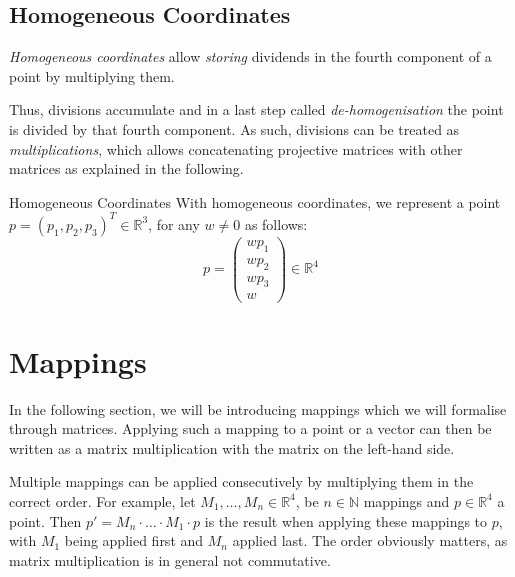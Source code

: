\documentclass{panikzettel}
\begin{document}
\subsection{Homogeneous Coordinates}
\begin{halfboxl}
\textit{Homogeneous coordinates} allow \emph{storing} dividends in the fourth component of a point by multiplying them.

Thus, divisions accumulate and in a last step called \emph{de-homogenisation} the point is divided by that fourth component. As such, divisions can be treated as \emph{multiplications}, which allows concatenating projective matrices with other matrices as explained in the following.
\end{halfboxl}%
\begin{halfboxr}
\vspace{-\baselineskip}
\begin{defi}{Homogeneous Coordinates}
With homogeneous coordinates, we represent a point $p = (p_1, p_2, p_3)^T \in \mathbb{R}^3$, for any $w \neq 0$ as follows:
$$p = \begin{pmatrix} wp_1 \\ wp_2 \\ wp_3 \\ w \end{pmatrix} \in \mathbb{R}^4$$
\end{defi}
\end{halfboxr}
\section{Mappings}

In the following section, we will be introducing mappings which we will formalise through matrices. Applying such a mapping to a point or a vector can then be written as a matrix multiplication with the matrix on the left-hand side.

Multiple mappings can be applied consecutively by multiplying them in the correct order. For example, let $M_1, \ldots , M_n \in \mathbb{R}^4$, be $n \in \mathbb{N}$ mappings and $p \in \mathbb{R}^4$ a point. Then $p'= M_n \cdot \ldots \cdot M_1 \cdot p$ is the result when applying these mappings to $p$, with $M_1$ being applied first and $M_n$ applied last. The order obviously matters, as matrix multiplication is in general not commutative.
\end{document}
